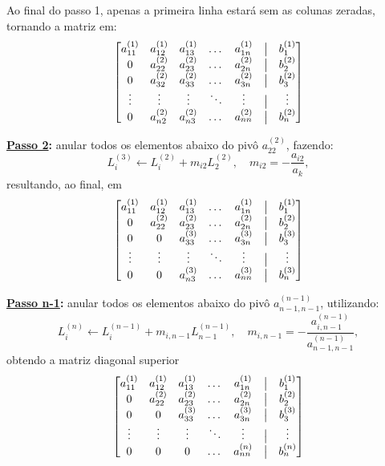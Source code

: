 \documentclass[../numerical_methods.tex]{subfiles}
\begin{document}
Ao final do passo 1, apenas a primeira linha estará sem as colunas zeradas, tornando a matriz em:
\[
	\begin{bmatrix}
		a_{11}^{(1)} & a_{12}^{(1)} & a_{13}^{(1)} & \dotsc & a_{1n}^{(1)} & \bigm| & b_{1}^{(1)} \\
		0            & a_{22}^{(2)} & a_{23}^{(2)} & \dotsc & a_{2n}^{(2)} & \bigm| & b_{2}^{(2)} \\
		0            & a_{32}^{(2)} & a_{33}^{(2)} & \dotsc & a_{3n}^{(2)} & \bigm| & b_{3}^{(2)} \\
		\vdots       & \vdots       & \vdots       & \ddots & \vdots       & \bigm| & \vdots      \\
		0            & a_{n2}^{(2)} & a_{n3}^{(2)} & \dotsc & a_{nn}^{(2)} & \bigm| & b_{n}^{(2)} \\
	\end{bmatrix}
\]

\textbf{\underline{Passo 2}:} anular todos os elementos abaixo do pivô \(a_{22}^{(2)}\), fazendo:
\[
	\boxed{L_{i}^{(3)}\leftarrow L_{i}^{(2)} + m_{i2}L_{2}^{(2)}, \quad m_{i2} = -\frac{a_{i2}}{a_{k}}},
\]
resultando, ao final, em
\[
	\begin{bmatrix}
		a_{11}^{(1)} & a_{12}^{(1)} & a_{13}^{(1)} & \dotsc & a_{1n}^{(1)} & \bigm| & b_{1}^{(1)} \\
		0            & a_{22}^{(2)} & a_{23}^{(2)} & \dotsc & a_{2n}^{(2)} & \bigm| & b_{2}^{(2)} \\
		0            & 0            & a_{33}^{(3)} & \dotsc & a_{3n}^{(3)} & \bigm| & b_{3}^{(3)} \\
		\vdots       & \vdots       & \vdots       & \ddots & \vdots       & \bigm| & \vdots      \\
		0            & 0            & a_{n3}^{(3)} & \dotsc & a_{nn}^{(3)} & \bigm| & b_{n}^{(3)} \\
	\end{bmatrix}
\]

\textbf{\underline{Passo n-1}:} anular todos os elementos abaixo do pivô \(a_{n-1, n-1}^{(n-1)}\), utilizando:
\[
	\boxed{L_{i}^{(n)}\leftarrow L_{i}^{(n-1)}+m_{i, n-1}L_{n-1}^{(n-1)},\quad m_{i, n-1} = - \frac{a_{i, n-1}^{(n-1)}}{a_{n-1, n-1}^{(n-1)}}},
\]
obtendo a matriz diagonal superior
\[
	\begin{bmatrix}
		a_{11}^{(1)} & a_{12}^{(1)} & a_{13}^{(1)} & \dotsc & a_{1n}^{(1)} & \bigm| & b_{1}^{(1)} \\
		0            & a_{22}^{(2)} & a_{23}^{(2)} & \dotsc & a_{2n}^{(2)} & \bigm| & b_{2}^{(2)} \\
		0            & 0            & a_{33}^{(3)} & \dotsc & a_{3n}^{(3)} & \bigm| & b_{3}^{(3)} \\
		\vdots       & \vdots       & \vdots       & \ddots & \vdots       & \bigm| & \vdots      \\
		0            & 0            & 0            & \dotsc & a_{nn}^{(n)} & \bigm| & b_{n}^{(n)} \\
	\end{bmatrix}
\]
\end{document}
